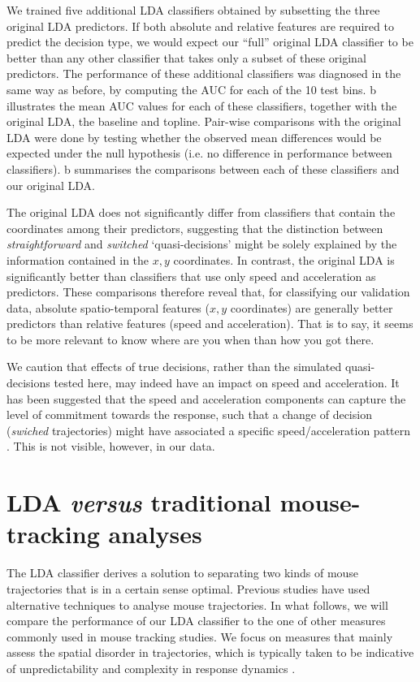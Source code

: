 \documentclass{article}
\begin{document}
We trained five additional LDA classifiers obtained by subsetting the three original LDA predictors. If both absolute and relative features are required to predict the decision type, we would expect our ``full'' original LDA classifier to be better than any other classifier that takes only a subset of these original predictors. 
The performance of these additional classifiers was diagnosed in the same way as before, by computing the AUC for each of the 10 test bins. b illustrates the mean AUC values for each of these classifiers, together with the original LDA, the baseline and topline. 
Pair-wise comparisons with the original LDA were done by testing whether the observed mean differences would be expected under the null hypothesis (i.e. no difference in performance between classifiers). b summarises the comparisons between each of these classifiers and our original LDA. 	

The original LDA does not significantly differ from classifiers that contain the coordinates among their predictors, suggesting that the distinction between \emph{straightforward} and \emph{switched} `quasi-decisions' might be solely explained by the information contained in the $x,y$ coordinates. 
In contrast, the original LDA is significantly better than classifiers that use only speed and acceleration as predictors. These comparisons therefore reveal that, for classifying our validation data, absolute spatio-temporal features ($x,y$ coordinates) are generally better predictors than relative features (speed and acceleration). That is to say, it seems to be more relevant to know where are you when than how you got there. 

We caution that effects of true decisions, rather than the simulated quasi-decisions tested here, may indeed have an impact on speed and acceleration. It has been suggested that the speed and acceleration components can capture the level of commitment towards the response, such that a change of decision (\textit{swiched} trajectories) might have associated a specific speed/acceleration pattern \citep{Hehman2014}. This is not visible, however, in our data.


\section{LDA \emph{versus} traditional mouse-tracking analyses}
\label{section:other-mt}
The LDA classifier derives a solution to separating two kinds of mouse trajectories that is in a certain sense optimal. Previous studies have used alternative techniques to analyse mouse trajectories. In what follows, we will compare the performance of our LDA classifier to the one of other measures commonly used in mouse tracking studies. We focus on measures that mainly assess the spatial disorder in trajectories, which is typically taken to be indicative of unpredictability and complexity in response dynamics \citep{Hehman2014}.
\end{document}
